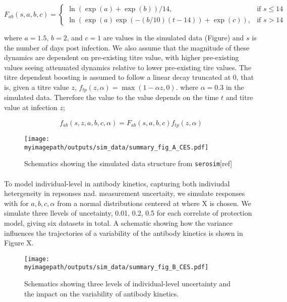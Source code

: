 \documentclass{article}
\newcommand{\myimagepath}{/Users/davidhodgson/Dropbox/Mac (3)/Documents/research/Rpackages/rjmc/}
\begin{document}
\begin{equation}
\label{eq_ab}
F_{ab}(s, a, b, c) =
\begin{cases}
  \ln(\exp(a) + \exp(b)) / 14, & \text{if }s \leq 14 \\
  \ln(\exp(a) \exp(-(b/10)(t - 14)) + \exp(c)), &\text{if } s > 14
\end{cases}
\end{equation}

where $a = 1.5$, $b = 2$, and $c = 1$ are values in the simulated data (Figure) and $s$ is the number of days post infection. We also assume that the magnitude of these dynamics are dependent on pre-existing titre value, with higher pre-existing values seeing attenuated dynamics relative to lower pre-existing tire values. The titre dependent boosting is assumed to follow a linear decay truncated at 0, that is, given a titre value $z$, $f_{tp}(z, \alpha) = \max(1 - \alpha z, 0)$. where $\alpha = 0.3 $ in the simulated data.  Therefore the value to the value depends on the time $t$ and titre value at infection $z$;  

\begin{equation}
\label{eq_ab2}
f_{ab}(s, z, a, b, c, \alpha) = F_{ab}(s, a, b, c)f_{tp}(z, \alpha) 
\end{equation}

\begin{figure}[ht]
    \centering
    \texttt{[image: \\myimagepath/outputs/sim\_data/summary\_fig\_A\_CES.pdf]}     \caption{Schematics showing the simulated data structure from \texttt{serosim}[ref]}
    \label{fig:sim_A}
\end{figure}



\paragraph{}To model individual-level in antibody kinetics, capturing both indiviudal hetergeneity in repsonses nad. measurement uncertaity, we simulate responses with for $a, b, c, \alpha$ from a normal distributions centered at where X is chosen. We simulate three  llevels of uncetainty, 0.01, 0.2, 0.5 for each correlate of protection model, giving six datasets in total. A schematic showing how the variance influences the trajectories of a variability of the antibody kinetics is shown in Figure X. 

\begin{figure}[ht]
    \centering
    \texttt{[image: \\myimagepath/outputs/sim\_data/summary\_fig\_B\_CES.pdf]}     \caption{Schematics showing three levels of individual-level uncertainty and the impact on the  variability of antibody kinetics.   }
    \label{fig:sim_B}
\end{figure}
\end{document}
